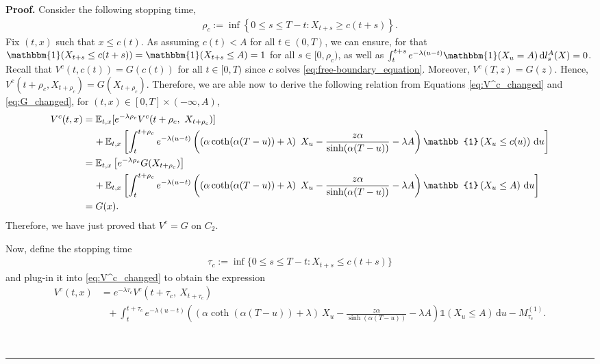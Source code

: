\documentclass{tufte-handout}
\newenvironment{pf}[1][Proof]{\textbf{#1.} }{\ \rule{0.5em}{0.5em}}
\begin{document}
\begin{pf}
		Consider the following stopping time,
		\begin{align}\label{eq:stopping_rho}
		\rho_c := \inf\left\{0 \leq s\leq T - t: X_{t + s} \geq c(t + s)\right\}.
		\end{align}
		Fix $(t, x)$ such that $x \leq c(t)$. As assuming $c(t) < A$ for all $t \in (0, T)$, we can ensure, for  that $\mathbbm{1}(X_{t + s} \leq c(t + s)) = \mathbbm{1}(X_{t + s} \leq A) = 1$ for all $s \in [0, \rho_c)$, as well as $\int_t^{t + s}e^{-\lambda (u - t)}\mathbbm{1}(X_u = A)\,\mathrm{d}l_s^A(X) = 0$. Recall that $V^{c}(t, c(t)) = G(c(t))$ for all $t\in[0,T)$ since $c$ solves \eqref{eq:free-boundary_equation}. Moreover, $V^c(T, z) = G(z)$. Hence, $V^c(t + \rho_{c}, X_{t + \rho_c}) = G(X_{t + \rho_c})$. Therefore, we are able now to derive the following relation from Equations \eqref{eq:V^c_changed} and \eqref{eq:G_changed}, for $(t, x)\in [0, T]\times (-\infty, A)$,
		\begin{align*}
		V^c(t, x) &= \mathbb{E}_{t, x}[e^{-\lambda \rho_c}V^c(t + \rho_c,\ X_{t + \rho_c})] \\
		& \hspace{0.4cm} + \mathbb{E}_{t, x}\left[\int_{t}^{t + \rho_c}e^{-\lambda(u - t)}\left(\left(\alpha\coth(\alpha(T - u)) + \lambda\right)\ X_{u} - \frac{z\alpha}{\sinh(\alpha(T - u))} - \lambda A \right)\mathbb{1}\left(X_{u}\leq c(u)\right)\,\mathrm{d}u\right] \\
		&= \mathbb{E}_{t, x}\left[e^{-\lambda\rho_c}G(X_{t + \rho_c})\right] \\
		&\hspace{0.4cm}  + \mathbb{E}_{t, x}\left[\int_{t}^{t + \rho_c}e^{-\lambda(u - t)}\left(\left(\alpha\coth(\alpha(T - u)) + \lambda\right)\ X_{u} - \frac{z\alpha}{\sinh(\alpha(T - u))} - \lambda A \right)\mathbb{1}\left(X_{u}\leq A\right)\,\mathrm{d}u\right] \\
		& = G(x).
		\end{align*}
		Therefore, we have just proved that $V^{c} = G$ on $C_{2}$.
		
		
		Now, define the stopping time
		\begin{align*}
		\tau_{c} := \inf\{0\leq s\leq T-t: X_{t + s} \leq c(t + s)\}
		\end{align*}
		and plug-in it into \eqref{eq:V^c_changed} to obtain the expression
		\begin{align*}
		V^c(t, x) &= e^{-\lambda \tau_c}V^c(t + \tau_c,\ X_{t + \tau_c}) \\
		&\ \ \ + \int_{t}^{t + \tau_c}e^{-\lambda(u - t)}\left(\left(\alpha\coth(\alpha(T - u)) + \lambda\right)\ X_{u} - \frac{z\alpha}{\sinh(\alpha(T - u))} - \lambda A \right)\mathbb{1}\left(X_{u}\leq A\right)\,\mathrm{d}u - M_{\tau_c}^{(1)}.
		\end{align*}
		

\end{pf}
\end{document}
